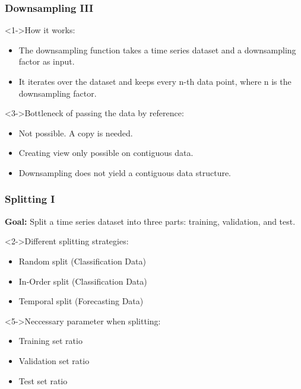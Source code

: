 \documentclass[t,english]{beamer}
\begin{document}
\begin{frame}
  \frametitle{Downsampling III}
    \begin{block}<1->{How it works:}
      \begin{itemize}
        \item<1-> The downsampling function takes a time series dataset and a downsampling factor as input.
        \item<2-> It iterates over the dataset and keeps every n-th data point, where n is the downsampling factor.
      \end{itemize}
    \end{block}

    \begin{block}<3->{Bottleneck of passing the data by reference:}
      \begin{itemize}
        \item<3-> Not possible. A copy is needed.
        \item <4-> Creating view only possible on contiguous data.
        \item <5-> Downsampling does not yield a contiguous data structure.
      \end{itemize}
    \end{block}
\end{frame}

\begin{frame}
  \frametitle{Splitting I}
    \textbf{Goal:} Split a time series dataset into three parts: training, validation, and test.

    \begin{block}<2->{Different splitting strategies:}
      \begin{itemize}
        \item<2-> Random split (Classification Data)
        \item<3-> In-Order split (Classification Data)
        \item<4-> Temporal split (Forecasting Data)
      \end{itemize}
    \end{block}

    \begin{block}<5->{Neccessary parameter when splitting:}
      \begin{itemize}
        \item<5-> Training set ratio
        \item<6-> Validation set ratio
        \item<7-> Test set ratio
      \end{itemize}
    \end{block}
\end{frame}
\end{document}
